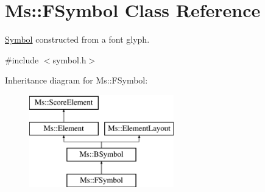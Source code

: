 \hypertarget{class_ms_1_1_f_symbol}{}\section{Ms\+:\+:F\+Symbol Class Reference}
\label{class_ms_1_1_f_symbol}


\hyperlink{class_ms_1_1_symbol}{Symbol} constructed from a font glyph.  




{\ttfamily \#include $<$symbol.\+h$>$}

Inheritance diagram for Ms\+:\+:F\+Symbol\+:\begin{figure}[H]
\begin{center}
\leavevmode
\includegraphics[height=4.000000cm]{class_ms_1_1_f_symbol}
\end{center}
\end{figure}
